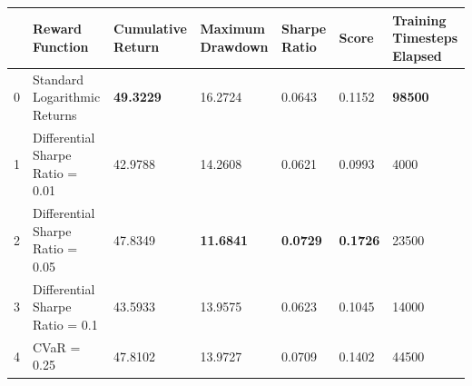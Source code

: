 \begin{tabular}{lllllll}
\toprule
 & Reward Function & Cumulative Return & Maximum Drawdown & Sharpe Ratio & Score & Training Timesteps Elapsed \\
\midrule
0 & Standard Logarithmic Returns & \textbf{49.3229} & 16.2724 & 0.0643 & 0.1152 & \textbf{98500} \\
1 & Differential Sharpe Ratio = 0.01 & 42.9788 & 14.2608 & 0.0621 & 0.0993 & 4000 \\
2 & Differential Sharpe Ratio = 0.05 & 47.8349 & \textbf{11.6841} & \textbf{0.0729} & \textbf{0.1726} & 23500 \\
3 & Differential Sharpe Ratio = 0.1 & 43.5933 & 13.9575 & 0.0623 & 0.1045 & 14000 \\
4 & CVaR = 0.25 & 47.8102 & 13.9727 & 0.0709 & 0.1402 & 44500 \\
\bottomrule
\end{tabular}
